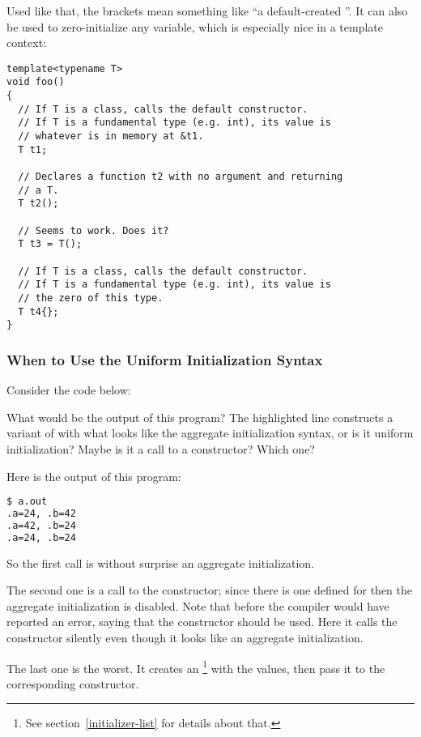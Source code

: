 Used like that, the brackets mean something like ``a default-created
''. It can also be used to zero-initialize any variable,
which is especially nice in a template context:

\begin{lstlisting}
template<typename T>
void foo()
{
  // If T is a class, calls the default constructor.
  // If T is a fundamental type (e.g. int), its value is
  // whatever is in memory at &t1.
  T t1;

  // Declares a function t2 with no argument and returning
  // a T.
  T t2();

  // Seems to work. Does it?
  T t3 = T();

  // If T is a class, calls the default constructor.
  // If T is a fundamental type (e.g. int), its value is
  // the zero of this type.
  T t4{};
}
\end{lstlisting}

\subsubsection{When to Use the Uniform Initialization Syntax}

Consider the code below:


What would be the output of this program? The highlighted line
constructs a variant of  with what looks like the aggregate
initialization syntax, or is it uniform initialization? Maybe is it a
call to a constructor? Which one?

Here is the output of this program:

\begin{lstlisting}[language=bash]
$ a.out
.a=24, .b=42
.a=42, .b=24
.a=24, .b=24
\end{lstlisting}

So the first call is without surprise an aggregate initialization.

The second one is a call to the constructor; since there is one
defined for  then the aggregate initialization
is disabled. Note that before  the compiler would have reported
an error, saying that the constructor should be used. Here it calls
the constructor silently even though it looks like an aggregate
initialization.

The last one is the worst. It creates an 
\footnote{See section~\ref{initializer-list} for details about that.}
with the values, then pass it to the corresponding constructor.

